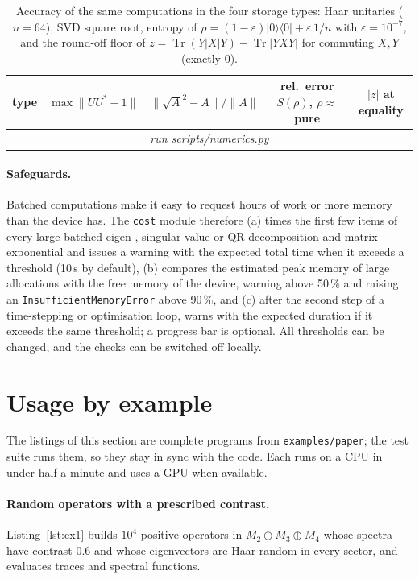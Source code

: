\documentclass[11pt]{article}
\DeclareMathOperator{\Tr}{Tr}
\providecommand{\NumAccRows}{\multicolumn{5}{c}{\emph{run scripts/numerics.py}}\\}
\begin{document}
\begin{table}[h]
\centering\small
\begin{tabular}{lcccc}
\toprule
type & $\max\|UU^*-1\|$ & $\|\sqrt A^2-A\|/\|A\|$ & rel.\ error $S(\rho)$, $\rho\approx$ pure & $|z|$ at equality\\
\midrule
\NumAccRows
\bottomrule
\end{tabular}
\caption{Accuracy of the same computations in the four storage types: Haar unitaries ($n=64$), SVD square
root, entropy of $\rho=(1-\varepsilon)|0\rangle\langle0|+\varepsilon\,1/n$ with $\varepsilon=10^{-7}$, and the
round-off floor of $z=\Tr(Y|X|Y)-\Tr|YXY|$ for commuting $X,Y$ (exactly $0$).}
\label{tab:numerics-acc}
\end{table}

\paragraph{Safeguards.} Batched computations make it easy to request hours of work or more memory than
the device has. The \texttt{cost} module therefore (a) times the first few items of every large
batched eigen-, singular-value or QR decomposition and matrix exponential and issues a warning with the expected
total time when it exceeds a threshold (10\,s by default), (b) compares the estimated peak memory of
large allocations with the free memory of the device, warning above 50\,\% and raising an
\texttt{InsufficientMemoryError} above 90\,\%, and (c) after the second step of a time-stepping
or optimisation loop, warns with the expected duration if it exceeds the same threshold; a progress bar is optional. All thresholds can
be changed, and the checks can be switched off locally.

\section{Usage by example}\label{sec:usage}

The listings of this section are complete programs from \texttt{examples/paper}; the test suite runs
them, so they stay in sync with the code. Each runs on a CPU in under half a minute and uses a GPU when available.

\paragraph{Random operators with a prescribed contrast.} Listing~\ref{lst:ex1} builds $10^4$ positive
operators in $M_2\oplus M_3\oplus M_4$ whose spectra have contrast $0.6$ and whose eigenvectors are
Haar-random in every sector, and evaluates traces and spectral functions.

\end{document}
